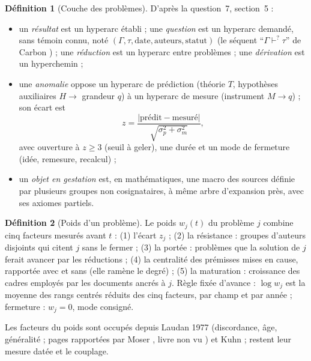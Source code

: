 \documentclass[11pt,a4paper]{article}
\theoremstyle{definition}
\newtheorem{definition}{Définition}[section]
\theoremstyle{plain}
\begin{document}
\begin{definition}[Couche des problèmes]
\label{def:problemes}
D'après la question~7, section~5 \cite{q7} :
\begin{itemize}
\item un \emph{résultat} est un hyperarc établi ; une \emph{question} est un hyperarc demandé, sans
témoin connu, noté $(\Gamma,\tau,\text{date},\text{auteurs},\text{statut})$ (le séquent
\enquote{$\Gamma\vdash^{?}\tau$} de Carbon \cite[section~3]{carbonmeta}) ; une \emph{réduction} est un
hyperarc entre problèmes ; une \emph{dérivation} est un hyperchemin ;
\item une \emph{anomalie} oppose un hyperarc de prédiction (théorie $T$, hypothèses auxiliaires
$H\to$ grandeur $q$) à un hyperarc de mesure (instrument $M\to q$) ; son écart est
\[ z=\frac{|\text{prédit}-\text{mesuré}|}{\sqrt{\sigma_p^2+\sigma_m^2}}, \]
avec ouverture à $z\ge 3$ (seuil à geler), une durée et un mode de fermeture (idée, remesure,
recalcul) ;
\item un \emph{objet en gestation} est, en mathématiques, une macro des sources définie par plusieurs
groupes non cosignataires, à même arbre d'expansion près, avec ses axiomes partiels.
\end{itemize}
\end{definition}

\begin{definition}[Poids d'un problème]
\label{def:poids}
Le poids $w_j(t)$ du problème $j$ combine cinq facteurs mesurés avant $t$ \cite[section~5]{q7} :
(1) l'écart $z_j$ ; (2) la résistance : groupes d'auteurs disjoints qui citent $j$ sans le fermer ;
(3) la portée : problèmes que la solution de $j$ ferait avancer par les réductions ; (4) la
centralité des prémisses mises en cause, rapportée avec et sans (elle ramène le degré) ; (5) la
maturation : croissance des cadres employés par les documents ancrés à $j$. Règle fixée d'avance :
$\log w_j$ est la moyenne des rangs centrés réduits des cinq facteurs, par champ et par année ;
fermeture : $w_j=0$, mode consigné.
\end{definition}

Les facteurs du poids sont occupés depuis Laudan 1977 (discordance, âge, généralité ; pages
rapportées par Moser \cite{moser1991}, livre non vu \cite{erratamineurs}) et Kuhn
\cite[p.~52 et 81-82]{kuhn1962} ; restent leur mesure datée et le couplage.
\end{document}
